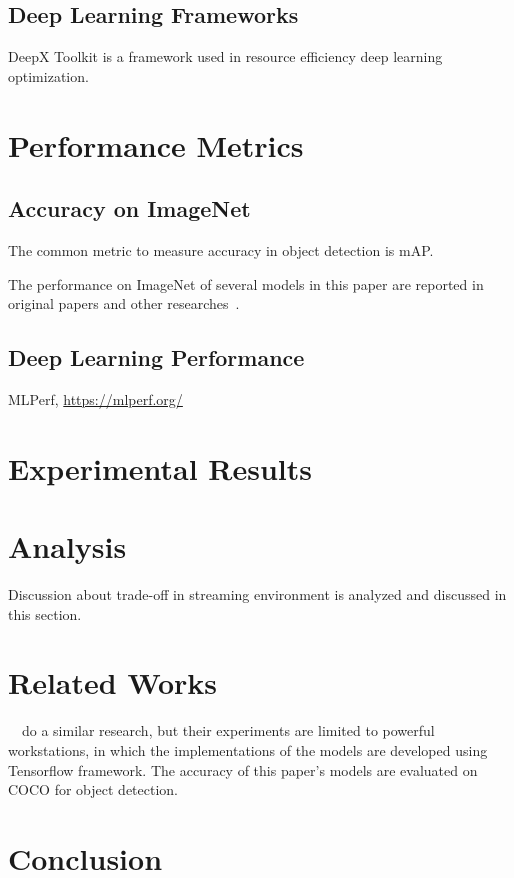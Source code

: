 \documentclass[conference]{IEEEtran}
\begin{document}
\subsection{Deep Learning Frameworks}
DeepX Toolkit is a framework used in resource efficiency deep learning optimization.

\section{Performance Metrics}

\subsection{Accuracy on ImageNet}
The common metric to measure accuracy in object detection is mAP.

The performance on ImageNet of several models in this paper are reported in original papers and other  researches~\cite{huang2017speed}.


\subsection{Deep Learning Performance}

MLPerf, \url{https://mlperf.org/}

\section{Experimental Results}

\section{Analysis}
Discussion about trade-off in streaming environment is analyzed and discussed in this section.

\section{Related Works}
~\cite{huang2017speed}~do a similar research, but their experiments are limited to powerful workstations, in which the implementations of the models are developed using Tensorflow framework. The accuracy of this paper's models are evaluated on COCO for object detection.


\section{Conclusion}


%





\end{document}
